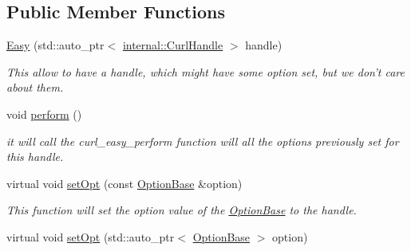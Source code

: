 \subsection*{Public Member Functions}
\begin{DoxyCompactItemize}
\item 
\hypertarget{classcurlpp_1_1Easy_a8c39568bc33b367d89337e216dc53acf}{\hyperlink{classcurlpp_1_1Easy_a8c39568bc33b367d89337e216dc53acf}{Easy} (std\-::auto\-\_\-ptr$<$ \hyperlink{classcurlpp_1_1internal_1_1CurlHandle}{internal\-::\-Curl\-Handle} $>$ handle)}\label{classcurlpp_1_1Easy_a8c39568bc33b367d89337e216dc53acf}

\begin{DoxyCompactList}\small\item\em This allow to have a handle, which might have some option set, but we don't care about them. \end{DoxyCompactList}\item 
\hypertarget{classcurlpp_1_1Easy_a3f6b472981811111365dbc537b06218d}{void \hyperlink{classcurlpp_1_1Easy_a3f6b472981811111365dbc537b06218d}{perform} ()}\label{classcurlpp_1_1Easy_a3f6b472981811111365dbc537b06218d}

\begin{DoxyCompactList}\small\item\em it will call the curl\-\_\-easy\-\_\-perform function will all the options previously set for this handle. \end{DoxyCompactList}\item 
\hypertarget{classcurlpp_1_1Easy_ae5b79592f7f01fab768f0dd733188e3b}{virtual void \hyperlink{classcurlpp_1_1Easy_ae5b79592f7f01fab768f0dd733188e3b}{set\-Opt} (const \hyperlink{classcurlpp_1_1OptionBase}{Option\-Base} \&option)}\label{classcurlpp_1_1Easy_ae5b79592f7f01fab768f0dd733188e3b}

\begin{DoxyCompactList}\small\item\em This function will set the option value of the \hyperlink{classcurlpp_1_1OptionBase}{Option\-Base} to the handle. \end{DoxyCompactList}\item 
\hypertarget{classcurlpp_1_1Easy_a576f15e11c3d691f389bffafab420f63}{virtual void \hyperlink{classcurlpp_1_1Easy_a576f15e11c3d691f389bffafab420f63}{set\-Opt} (std\-::auto\-\_\-ptr$<$ \hyperlink{classcurlpp_1_1OptionBase}{Option\-Base} $>$ option)}\label{classcurlpp_1_1Easy_a576f15e11c3d691f389bffafab420f63}


\end{DoxyCompactItemize}
